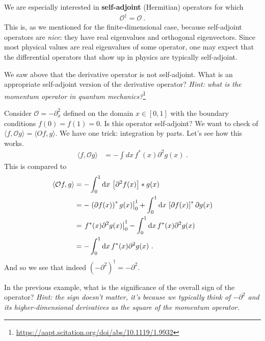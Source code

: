 We are especially interested in \textbf{self-adjoint} (Hermitian) operators for which
\begin{align}
  \mathcal O^\dag = \mathcal O \ .
\end{align}
This is, as we mentioned for the finite-dimensional case, because self-adjoint operators are \emph{nice}: they have real eigenvalues and orthogonal eigenvectors. Since most physical values are real eigenvalues of some operator, one may expect that the differential operators that show up in physics are typically self-adjoint.
\begin{exercise}
We saw above that the derivative operator is not self-adjoint. What is an appropriate self-adjoint version of the derivative operator? \emph{Hint: what is the momentum operator in quantum mechanics?}\footnote{\url{https://aapt.scitation.org/doi/abs/10.1119/1.9932}} 
\end{exercise}
\begin{example}
Consider $\mathcal O = -\partial_x^2$ defined on the domain $x\in [0,1]$ with the boundary conditions $f(0)=f(1)=0$. Is this operator self-adjoint? We want to check of $\langle f,\mathcal O g\rangle = \langle O f, g \rangle$. We have one trick: integration by parts. Let's see how this works.
\begin{align}
  \langle f, \mathcal O g\rangle &= - \int dx\, f^*(x)\partial^2 g(x) \ .
\end{align}
This is compared to
\begin{align}
  \langle \mathcal O f, g\rangle 
  &= -\int^1_0 \operatorname{d}\mkern-3mu^{}\mkern-1mu{x }\, \left[\partial^2 f(x)\right]*g(x) 
  \\
  &= 
  -\left.\left(\partial f(x)\right)^*g(x)\right|^1_0
  + \int^1_0 \operatorname{d}\mkern-3mu^{}\mkern-1mu{x} \, \left[\partial f(x)\right]^* \partial g(x) 
  \\
  &= \left.f^*(x)\partial^2 g(x)\right|^1_0
  - \int^1_0 \operatorname{d}\mkern-3mu^{}\mkern-1mu{x} \, f^*(x) \partial^2 g(x)  
  \\
  &=
  - \int^1_0 \operatorname{d}\mkern-3mu^{}\mkern-1mu{x} \, f^*(x) \partial^2 g(x)  
  \ .
\end{align}
And so we see that indeed $(-\partial^2)^\dag = -\partial^2$.
\end{example}
\begin{exercise}
In the previous example, what is the significance of the overall sign of the operator? \emph{Hint: the sign doesn't matter, it's because we typically think of $-\partial^2$ and its higher-dimensional derivatives as the square of the momentum operator.}
\end{exercise}
